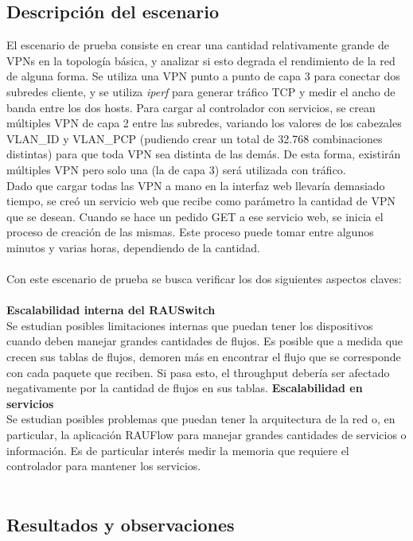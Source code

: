 \subsection{Descripción del escenario}
El escenario de prueba consiste en crear una cantidad relativamente grande de VPNs en la topología básica, y analizar si esto degrada el rendimiento de la red de alguna forma. Se utiliza una VPN punto a punto de capa 3 para conectar dos subredes cliente, y se utiliza \textit{iperf} para generar tráfico TCP y medir el ancho de banda entre los dos hosts. Para cargar al controlador con servicios, se crean múltiples VPN de capa 2 entre las subredes, variando los valores de los cabezales VLAN\_ID y VLAN\_PCP (pudiendo crear un total de 32.768 combinaciones distintas) para que toda VPN sea distinta de las demás. De esta forma, existirán múltiples VPN pero solo una (la de capa 3) será utilizada con tráfico. \\
Dado que cargar todas las VPN a mano en la interfaz web llevaría demasiado tiempo, se creó un servicio web que recibe como parámetro la cantidad de VPN que se desean. Cuando se hace un pedido GET a ese servicio web, se inicia el proceso de creación de las mismas. Este proceso puede tomar entre algunos minutos y varias horas, dependiendo de la cantidad. \\ \\
Con este escenario de prueba se busca verificar los dos siguientes aspectos claves: \\ \\
\textbf{Escalabilidad interna del RAUSwitch} \\
Se estudian posibles limitaciones internas que puedan tener los dispositivos cuando deben manejar grandes cantidades de flujos. Es posible que a medida que crecen sus tablas de flujos, demoren más en encontrar el flujo que se corresponde con cada paquete que reciben. Si pasa esto, el throughput debería ser afectado negativamente por la cantidad de flujos en sus tablas.
\textbf{Escalabilidad en servicios} \\
Se estudian posibles problemas que puedan tener la arquitectura de la red o, en particular, la aplicación RAUFlow para manejar grandes cantidades de servicios o información. Es de particular interés medir la memoria que requiere el controlador para mantener los servicios. \\ \\

\subsection{Resultados y observaciones}

